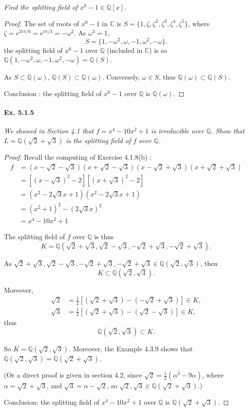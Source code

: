 \documentclass[11pt,a4paper]{article}
\newcommand{\Q}{\mathbb{Q}}
\newcommand{\C}{\mathbb{C}}
\begin{document}
{\it Find the splitting field of $x^6-1 \in \Q[x]$.
}

\begin{proof}
The set of roots of $x^6-1$ in $\C$  is $S = \{1,\zeta,\zeta^2,\zeta^3,\zeta^4,\zeta^5\}$, where ${\zeta = e^{2i\pi/6} = e^{i\pi/3} = -\omega^2}$.
As $\omega^3=1$, 
$$S = \{1, -\omega^2, \omega,-1,\omega^2,-\omega\}.$$
the splitting field of $x^6-1$ over $\Q$ (included in $\C$) is so $\Q(1, -\omega^2, \omega,-1,\omega^2,-\omega) = \Q(S)$.

As $S \subset \Q(\omega)$, $\Q(S) \subset \Q(\omega)$.
Conversely, $\omega \in S$, thus $\Q(\omega) \subset \Q(S)$.

Conclusion : the splitting field of $x^6-1$ over $\Q$ is $\Q(\omega)$.
\end{proof}

\paragraph{Ex. 5.1.5}

{\it We showed in Section 4.1 that $f =x^4-10x^2+1$ is irreducible over $\Q$. Show that $L = \Q(\sqrt{2}+ \sqrt{3})$ is the splitting field of $f$ over $\Q$.
}

\begin{proof}
Recall the computing of Exercise 4.1.8(b) : 
\begin{align*}
 f&= (x-\sqrt{2} - \sqrt{3})(x+\sqrt{2} -\sqrt{3}) (x-\sqrt{2} + \sqrt{3})(x+\sqrt{2} + \sqrt{3})\\
&=[(x-\sqrt{3})^2-2][(x+\sqrt{3})^2-2]\\
&= (x^2 -2\sqrt{3} x +1)(x^2 -2\sqrt{3} x +1)\\
&= (x^2+1)^2 - (2\sqrt{3}x)^2\\
&=x^4 -10x^2 +1
\end{align*}

The splitting field of $f$ over $\Q$ is thus $$K = \Q(\sqrt{2} + \sqrt{3},\sqrt{2} - \sqrt{3},-\sqrt{2} + \sqrt{3},-\sqrt{2} + \sqrt{3}).$$

As  $\sqrt{2} + \sqrt{3},\sqrt{2} - \sqrt{3},-\sqrt{2} + \sqrt{3},-\sqrt{2} + \sqrt{3} \in  \Q(\sqrt{2},\sqrt{3})$, then $$K \subset \Q(\sqrt{2},\sqrt{3}).$$

Moreover, 
\begin{align*}
\sqrt{2} &= \frac{1}{2}\left[(\sqrt{2}+\sqrt{3}) - (-\sqrt{2}+\sqrt{3})\right] \in K,\\
 \sqrt{3} &= \frac{1}{2}\left[(\sqrt{2}+\sqrt{3}) - (\sqrt{2}-\sqrt{3}) \right]\in K,
 \end{align*}
thus $$\Q(\sqrt{2},\sqrt{3}) \subset K.$$

So $K = \Q(\sqrt{2},\sqrt{3})$. Moreover, the Example 4.3.9 shows that $\Q(\sqrt{2},\sqrt{3}) = \Q(\sqrt{2}+\sqrt{3})$.

(Or a direct proof is given in  section 4.2, since $\sqrt{2} = \frac{1}{2}(\alpha^3 - 9 \alpha)$, where $\alpha = \sqrt{2}+\sqrt{3}$, and $\sqrt{3} = \alpha - \sqrt{2}$, so $\sqrt{2},\sqrt{3} \in \Q(\sqrt{2}+\sqrt{3})$.)

Conclusion: the splitting field of $x^4-10x^2+1$ over $\Q$ is $\Q(\sqrt{2}+\sqrt{3})$.
\end{proof}
\end{document}
